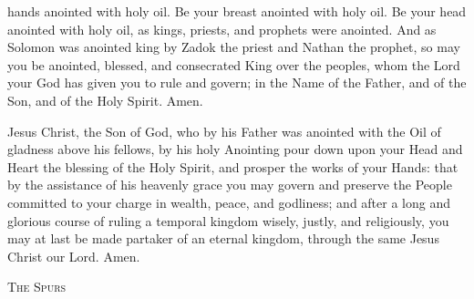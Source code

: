 {









 hands anointed with holy oil.
Be your breast anointed with holy oil.
Be your head anointed with holy oil,
as kings, priests, and prophets were anointed.
And as Solomon was anointed king by Zadok the priest and Nathan the prophet, so
may you be anointed, blessed, and consecrated King over the peoples, whom the Lord
your God has given you to rule and govern; in the Name of the Father, and of the Son,
and of the Holy Spirit.
Amen.











 Jesus Christ, the Son of God,
who by his Father was anointed with the Oil of gladness
above his fellows,
by his holy Anointing pour down upon your Head and Heart
the blessing of the Holy Spirit,
and prosper the works of your Hands:
that by the assistance of his heavenly grace
you may govern and preserve
the People committed to your charge
in wealth, peace, and godliness;
and after a long and glorious course
of ruling a temporal kingdom
wisely, justly, and religiously,
you may at last be made partaker of an eternal kingdom,
through the same Jesus Christ our Lord.
Amen.





\begin{center}\color{qred}\scshape The Spurs \end{center}	



}
